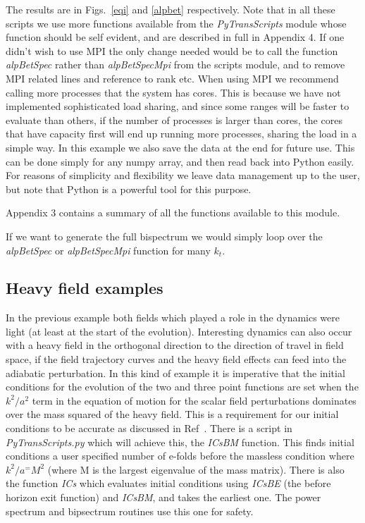 \documentclass[10pt,
amsmath,amssymb,
aps,prd,nofootinbib,eqsecnum,a4paper]{revtex4}
\begin{document}
The results are in Figs.~\ref{eqi} and \ref{alpbet} respectively. 
Note that in all these scripts we use more functions available from the {\it PyTransScripts} module whose function 
should be self evident, and are described in full in Appendix 4.
If one didn't wish to use MPI the only change needed would be to call the function {\it alpBetSpec} rather than 
{\it alpBetSpecMpi} from the scripts module, and to remove MPI related lines and reference to 
rank etc.
When using MPI we recommend calling more processes 
that the system has cores. This is because we have not implemented sophisticated load sharing, and since 
some ranges will be faster to evaluate than others, if 
the number of processes is larger than cores, the cores that have capacity first will end up running more processes, 
sharing the load in a simple way. In this example we also save the data at the end for future use. This can be done 
simply for any numpy array, and then read back into Python easily. For reasons of simplicity and flexibility 
we leave data management up to the user, but note that Python is a powerful tool for this purpose.

Appendix 3 contains a summary of all the functions available to this module.

If we want to generate the full bispectrum we would simply loop over the {\it alpBetSpec} or {\it alpBetSpecMpi}
function for many $k_t$.

\subsection{Heavy field examples}
\label{heavy}

In the previous example both fields which played a role in the dynamics 
were light (at least at the start of the evolution). Interesting dynamics 
can also occur with a heavy field in the orthogonal direction to the direction of travel 
in field space, if 
the field trajectory curves and the heavy field effects can feed into the adiabatic 
perturbation. In this kind of example it is imperative that the initial conditions for the evolution of the two and three point functions are set when the $k^2/a^2$ term in the equation of motion for the scalar field perturbations 
dominates over the mass squared of the heavy 
field. This is a requirement for our initial conditions to be accurate as discussed in Ref~\cite{xxx}. 
There is a script in {\it PyTransScripts.py} which 
will achieve this, the {\it ICsBM} function. This finds initial conditions a user specified number of e-folds before the 
massless condition where $k^2/a^=M^2$ (where M is the largest eigenvalue of the mass matrix). 
There is also the function {\it ICs} which evaluates initial conditions using {\it ICsBE} (the before horizon exit 
function) and {\it ICsBM}, and takes the earliest one. The power spectrum and bipsectrum routines use this one for safety.
\end{document}
